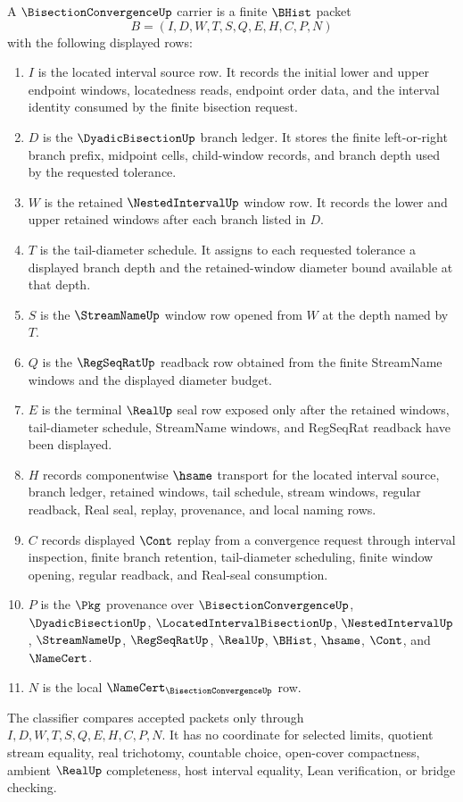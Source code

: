 \begin{definition}
\label{def:bisection-convergence-carrier}
A $\BisectionConvergenceUp$ carrier is a finite $\BHist$ packet
$$
B=(I,D,W,T,S,Q,E,H,C,P,N)
$$
with the following displayed rows:
\begin{enumerate}
\item $I$ is the located interval source row. It records the initial lower and upper endpoint windows, locatedness reads, endpoint order data, and the interval identity consumed by the finite bisection request.
\item $D$ is the $\DyadicBisectionUp$ branch ledger. It stores the finite left-or-right branch prefix, midpoint cells, child-window records, and branch depth used by the requested tolerance.
\item $W$ is the retained $\NestedIntervalUp$ window row. It records the lower and upper retained windows after each branch listed in $D$.
\item $T$ is the tail-diameter schedule. It assigns to each requested tolerance a displayed branch depth and the retained-window diameter bound available at that depth.
\item $S$ is the $\StreamNameUp$ window row opened from $W$ at the depth named by $T$.
\item $Q$ is the $\RegSeqRatUp$ readback row obtained from the finite StreamName windows and the displayed diameter budget.
\item $E$ is the terminal $\RealUp$ seal row exposed only after the retained windows, tail-diameter schedule, StreamName windows, and RegSeqRat readback have been displayed.
\item $H$ records componentwise $\hsame$ transport for the located interval source, branch ledger, retained windows, tail schedule, stream windows, regular readback, Real seal, replay, provenance, and local naming rows.
\item $C$ records displayed $\Cont$ replay from a convergence request through interval inspection, finite branch retention, tail-diameter scheduling, finite window opening, regular readback, and Real-seal consumption.
\item $P$ is the $\Pkg$ provenance over $\BisectionConvergenceUp$, $\DyadicBisectionUp$, $\LocatedIntervalBisectionUp$, $\NestedIntervalUp$, $\StreamNameUp$, $\RegSeqRatUp$, $\RealUp$, $\BHist$, $\hsame$, $\Cont$, and $\NameCert$.
\item $N$ is the local $\NameCert_{\BisectionConvergenceUp}$ row.
\end{enumerate}
The classifier compares accepted packets only through $I,D,W,T,S,Q,E,H,C,P,N$. It has no coordinate for selected limits, quotient stream equality, real trichotomy, countable choice, open-cover compactness, ambient $\RealUp$ completeness, host interval equality, Lean verification, or bridge checking.
\end{definition}

